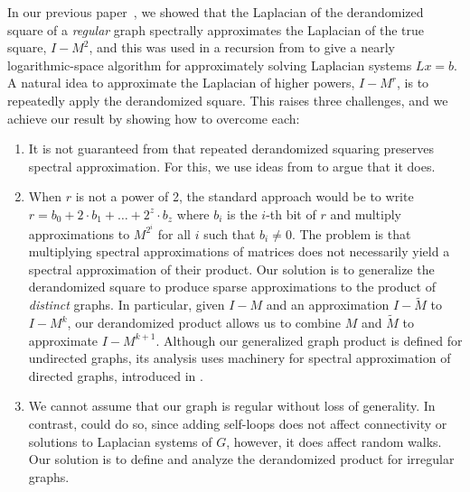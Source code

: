 \documentclass[11pt]{article}
\numberwithin{equation}{section}
\theoremstyle{definition}
\theoremstyle{plain}
\newcommand{\wt}{\widetilde}   %
\numberwithin{myalgctr}{section}
\theoremstyle{named}
\begin{document}
In our previous %
paper~\cite{derandbeyond2017}, we showed that the Laplacian of the derandomized square of a \emph{regular} graph spectrally approximates the Laplacian of the true square, $I-M^2$, and this was used in a recursion from \cite{PS13} to give a nearly logarithmic-space algorithm for approximately solving Laplacian systems $Lx=b$. A natural idea to approximate the Laplacian of higher powers, $I-M^r$, is to repeatedly apply the derandomized square. This raises three challenges, and we achieve our result by showing how to overcome each: 
\begin{enumerate}
\item It is not guaranteed from \cite{derandbeyond2017} that repeated derandomized squaring preserves spectral approximation. For this, we use ideas from \cite{cheng2015} to argue that it does.
\item When $r$ is not a power of 2, the standard approach would be to write $r=b_0+2\cdot b_1+\ldots+2^z\cdot b_z$ where $b_i$ is the $i$-th bit of $r$ and multiply approximations to $M^{2^{i}}$ for all $i$ such that $b_i\neq 0$. The problem is that multiplying spectral approximations of matrices does not necessarily yield a spectral approximation of their product. Our solution is to generalize the derandomized square to produce sparse approximations to the product of \emph{distinct} graphs. In particular, given $I-M$ and an approximation $I-\wt{M}$ to $I-M^k$, our derandomized product allows us to combine $M$ and $\wt{M}$ to approximate $I-M^{k+1}$. Although our generalized graph product is defined for undirected graphs, its analysis uses machinery for spectral approximation of directed graphs, introduced in \cite{CKPPRSV16}.
\item We cannot assume that our graph is regular without loss of generality. In contrast, \cite{Reingold08,RozenmanVa05,derandbeyond2017} could do so, since adding self-loops does not affect connectivity or solutions to Laplacian systems of $G$, however, it does affect random walks. Our solution is to define and analyze the derandomized product for irregular graphs.
\end{enumerate}
\end{document}
